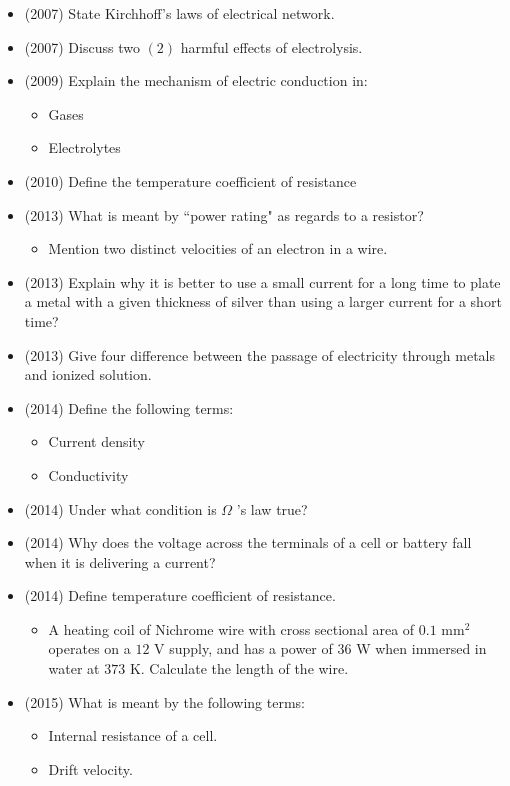 \documentclass{article}
\begin{document}
\begin{itemize}
\item (2007)  State Kirchhoff's laws of electrical network.
\item (2007)  Discuss two $ (2)$ harmful effects of electrolysis. 
\item (2009)  Explain the mechanism of electric conduction in:
 \begin{itemize}
\item Gases
\item Electrolytes
\end{itemize}
\item (2010)  Define the temperature coefficient of resistance
\item (2013)  What is meant by “power rating" as regards to a resistor?
 \begin{itemize}
\item Mention two distinct velocities of an electron in a wire.
\end{itemize}
\item (2013)  Explain why it is better to use a small current for a long time to plate a metal with a given thickness of silver than using a larger current for a short time? 
\item (2013)  Give four difference between the passage of electricity through metals and  ionized solution.
\item (2014)  Define the following terms:
 \begin{itemize}
\item Current density
\item Conductivity 
\end{itemize}
\item (2014)  Under what condition is $ \Omega $ ’s law true?
\item (2014)  Why does the voltage across the terminals of a cell or battery fall when it is delivering a current? 
\item (2014)  Define temperature coefficient of resistance.
 \begin{itemize}
\item A heating coil of Nichrome wire with cross sectional area of $ 0.1 $ mm$ ^{2}$ operates on a $ 12$ V supply, and has a power of $ 36$ W when immersed in water at $ 373$ K. Calculate the length of the wire.
\end{itemize}
\item (2015)  What is meant by the following terms:
 \begin{itemize}
\item  Internal resistance of a cell. 
\item  Drift velocity. 

\end{itemize}
\end{itemize}
\end{document}

